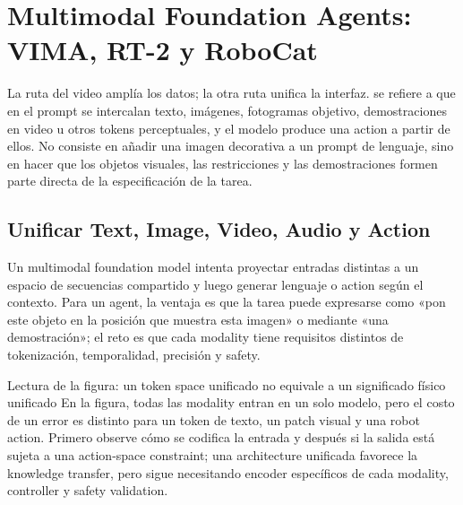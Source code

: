 \section{Multimodal Foundation Agents: VIMA, RT-2 y RoboCat}

La ruta del video amplía los datos; la otra ruta unifica la interfaz.  se refiere a que en el prompt se intercalan texto, imágenes, fotogramas objetivo, demostraciones en video u otros tokens perceptuales, y el modelo produce una action a partir de ellos. No consiste en añadir una imagen decorativa a un prompt de lenguaje, sino en hacer que los objetos visuales, las restricciones y las demostraciones formen parte directa de la especificación de la tarea.

\subsection{Unificar Text, Image, Video, Audio y Action}

Un multimodal foundation model intenta proyectar entradas distintas a un espacio de secuencias compartido y luego generar lenguaje o action según el contexto. Para un agent, la ventaja es que la tarea puede expresarse como «pon este objeto en la posición que muestra esta imagen» o mediante «una demostración»; el reto es que cada modality tiene requisitos distintos de tokenización, temporalidad, precisión y safety.


\begin{knowledgebox}{Lectura de la figura: un token space unificado no equivale a un significado físico unificado}
En la figura, todas las modality entran en un solo modelo, pero el costo de un error es distinto para un token de texto, un patch visual y una robot action. Primero observe cómo se codifica la entrada y después si la salida está sujeta a una action-space constraint; una architecture unificada favorece la knowledge transfer, pero sigue necesitando encoder específicos de cada modality, controller y safety validation.
\end{knowledgebox}


